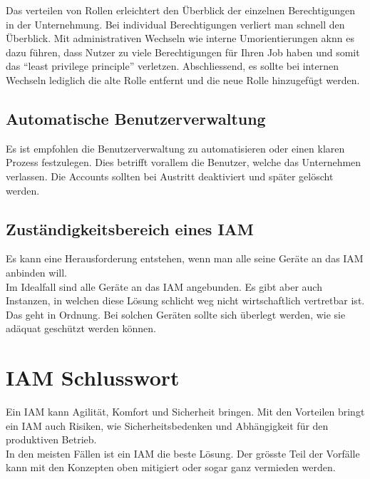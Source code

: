 Das verteilen von Rollen erleichtert den Überblick der einzelnen Berechtigungen in der Unternehmung.
Bei individual Berechtigungen verliert man schnell den Überblick.
Mit administrativen Wechseln wie interne Umorientierungen aknn es dazu führen, dass Nutzer zu viele Berechtigungen für Ihren Job haben und somit das ``least privilege principle'' verletzen.
Abschliessend, es sollte bei internen Wechseln lediglich die alte Rolle entfernt und die neue Rolle hinzugefügt werden.


\subsection{Automatische Benutzerverwaltung}
Es ist empfohlen die Benutzerverwaltung zu automatisieren oder einen klaren Prozess festzulegen.
Dies betrifft vorallem die Benutzer, welche das Unternehmen verlassen.
Die Accounts sollten bei Austritt deaktiviert und später gelöscht werden.


\subsection{Zuständigkeitsbereich eines IAM}
Es kann eine Herausforderung entstehen, wenn man alle seine Geräte an das IAM anbinden will.\\

Im Idealfall sind alle Geräte an das IAM angebunden.
Es gibt aber auch Instanzen, in welchen diese Lösung schlicht weg nicht wirtschaftlich vertretbar ist.
Das geht in Ordnung.
Bei solchen Geräten sollte sich überlegt werden, wie sie adäquat geschützt werden können.

\section{IAM Schlusswort}
Ein IAM kann Agilität, Komfort und Sicherheit bringen.
Mit den Vorteilen bringt ein IAM auch Risiken, wie Sicherheitsbedenken und Abhängigkeit für den produktiven Betrieb.\\

In den meisten Fällen ist ein IAM die beste Lösung.
Der grösste Teil der Vorfälle kann mit den Konzepten oben mitigiert oder sogar ganz vermieden werden.